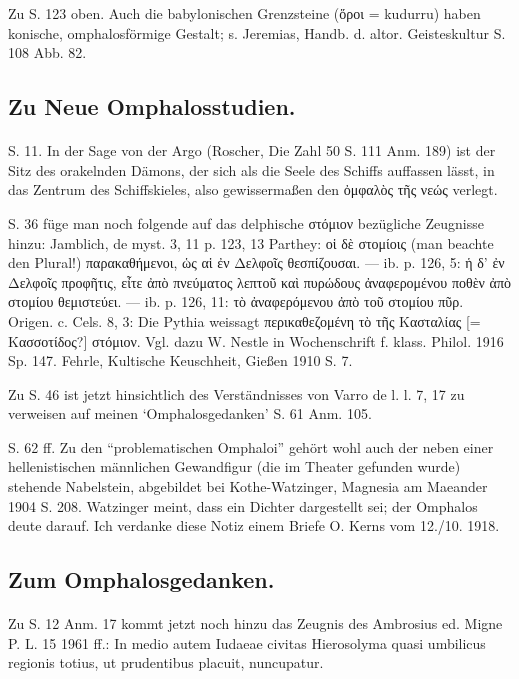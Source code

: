 \documentclass[a4paper, 11pt, oneside]{article}
\begin{document}
Zu S. 123 oben. Auch die babylonischen Grenzsteine (ὅροι = kudurru) haben konische, omphalosförmige Gestalt; s. Jeremias, Handb. d. altor. Geisteskultur S. 108 Abb. 82.

\subsection{Zu Neue Omphalosstudien.}
\paragraph{}
S. 11. In der Sage von der Argo (Roscher, Die Zahl 50 S. 111 Anm. 189) ist der Sitz des orakelnden Dämons, der sich als die Seele des Schiffs auffassen lässt, in das Zentrum des Schiffskieles, also gewissermaßen den ὀμφαλὸς τῆς νεώς verlegt.

S. 36 füge man noch folgende auf das delphische στόμιον bezügliche Zeugnisse hinzu: Jamblich, de myst. 3, 11 p. 123, 13 Parthey: οἱ δὲ στομίοις (man beachte den Plural!) παρακαθήμενοι, ὡς αἱ ἐν Δελφοῖς θεσπίζουσαι. --- ib. p. 126, 5: ἡ δ' ἐν Δελφοῖς προφῆτις, εἶτε ἀπὸ πνεύματος λεπτοῦ καὶ πυρώδους ἀναφερομένου ποθὲν ἀπὸ στομίου θεμιστεύει. --- ib. p. 126, 11: τὸ ἀναφερόμενου ἀπὸ τοῦ στομίου πῦρ. Origen. c. Cels. 8, 3: Die Pythia weissagt περικαθεζομένη τὸ τῆς Κασταλίας [= Κασσοτίδος?] στόμιον. Vgl. dazu W. Nestle in Wochenschrift f. klass. Philol. 1916 Sp. 147. Fehrle, Kultische Keuschheit, Gießen 1910 S. 7.

Zu S. 46 ist jetzt hinsichtlich des Verständnisses von Varro de l. l. 7, 17 zu verweisen auf meinen `Omphalosgedanken' S. 61 Anm. 105.

S. 62 ff. Zu den "`problematischen Omphaloi"' gehört wohl auch der neben einer hellenistischen männlichen Gewandfigur (die im Theater gefunden wurde) stehende Nabelstein, abgebildet bei Kothe-Watzinger, Magnesia am Maeander 1904 S. 208. Watzinger meint, dass ein Dichter dargestellt sei; der Omphalos deute darauf. Ich verdanke diese Notiz einem Briefe O. Kerns vom 12./10. 1918.

\subsection{Zum Omphalosgedanken.}
\paragraph{}
Zu S. 12 Anm. 17 kommt jetzt noch hinzu das Zeugnis des Ambrosius ed. Migne P. L. 15 1961 ff.: In medio autem Iudaeae civitas Hierosolyma quasi umbilicus regionis totius, ut prudentibus placuit, nuncupatur.
\end{document}
